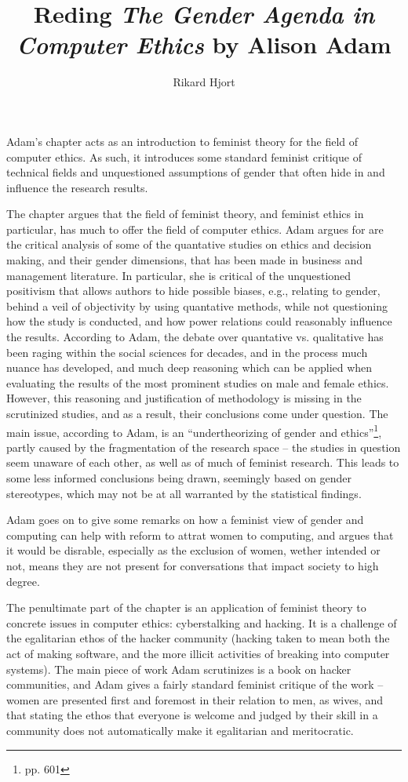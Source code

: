 \documentclass{article}
\title{Reding \emph{The Gender Agenda in Computer Ethics} by Alison Adam}
\author{Rikard Hjort}
\begin{document}
\maketitle

Adam's chapter acts as an introduction to feminist theory for the field of
computer ethics. As such, it introduces some standard feminist critique of
technical fields and unquestioned assumptions of gender that often hide in and
influence the research results.

The chapter argues that the field of feminist theory, and feminist ethics in
particular, has much to offer the field of computer ethics. Adam argues for are
the critical analysis of some of the quantative studies on ethics and decision
making, and their gender dimensions, that has been made in business and
management literature. In particular, she is critical of the unquestioned
positivism that allows authors to hide possible biases, e.g., relating to
gender, behind a veil of objectivity by using quantative methods, while not
questioning how the study is conducted, and how power relations could reasonably
influence the results. According to Adam, the debate over quantative vs.
qualitative has been raging within the social sciences for decades, and in the process
much nuance has developed, and much deep reasoning which can be applied when evaluating
the results of the most prominent studies on male and female ethics. However,
this reasoning and justification of methodology is missing in the scrutinized
studies, and as a result, their conclusions come under question. The main issue,
according to Adam, is an ``undertheorizing of gender and ethics''\footnote{pp.
  601}, partly caused by the fragmentation of the research space -- the studies
in question seem unaware of each other, as well as of much of feminist research.
This leads to some less informed conclusions being drawn, seemingly based on
gender stereotypes, which may not be at all warranted by the statistical findings.

Adam goes on to give some remarks on how a feminist view of gender and computing
can help with reform to attrat women to computing, and argues that it would be
disrable, especially as the exclusion of women, wether intended or not, means
they are not present for conversations that impact society to high degree.

The penultimate part of the chapter is an application of feminist theory to concrete
issues in computer ethics: cyberstalking and hacking. It is a challenge of the
egalitarian ethos of the hacker community (hacking taken to mean both the act of
making software, and the more illicit activities of breaking into computer
systems). The main piece of work Adam scrutinizes is a book on hacker
communities, and Adam gives a fairly standard feminist critique of the work --
women are presented first and foremost in their relation to men, as wives, and
that stating the ethos that everyone is welcome and judged by their skill in a
community does not automatically make it egalitarian and meritocratic.
\end{document}
